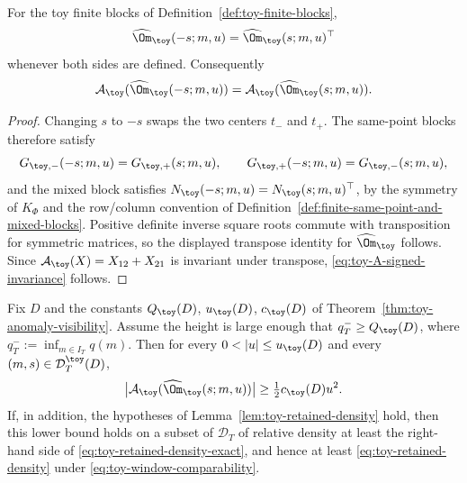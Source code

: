 \begin{lemma}
\label{lem:toy-signed-separation-invariance}
For the toy finite blocks of Definition~\ref{def:toy-finite-blocks},
\[
        \widehat\Om_\toy(-s;m,u)=\widehat\Om_\toy(s;m,u)^\top
\]
whenever both sides are defined.  Consequently
\begin{equation}
\label{eq:toy-A-signed-invariance}
        \mathcal A_\toy(\widehat\Om_\toy(-s;m,u))
        =\mathcal A_\toy(\widehat\Om_\toy(s;m,u)).
\end{equation}
\end{lemma}

\begin{proof}
Changing \(s\) to \(-s\) swaps the two centers \(t_-\) and \(t_+\).
The same-point blocks therefore satisfy
\[
        G_{\toy,-}(-s;m,u)=G_{\toy,+}(s;m,u),\qquad
        G_{\toy,+}(-s;m,u)=G_{\toy,-}(s;m,u),
\]
and the mixed block satisfies
\(N_\toy(-s;m,u)=N_\toy(s;m,u)^\top\), by the symmetry of
\(K_\Phi\) and the row/column convention of
Definition~\ref{def:finite-same-point-and-mixed-blocks}.  Positive
definite inverse square roots commute with transposition for symmetric
matrices, so the displayed transpose identity for \(\widehat\Om_\toy\)
follows.  Since
\(\mathcal A_\toy(X)=X_{12}+X_{21}\) is invariant under transpose,
\eqref{eq:toy-A-signed-invariance} follows.
\end{proof}


\begin{corollary}
\label{cor:toy-visibility-polynomial-weight}
Fix \(D\) and the constants \(Q_\toy(D)\), \(u_\toy(D)\), \(c_\toy(D)\)
of Theorem~\ref{thm:toy-anomaly-visibility}.  Assume the height is large
enough that \(q_T^-\ge Q_\toy(D)\), where
\(q_T^-:=\inf_{m\in I_T}q(m)\).  Then for every \(0<|u|\le
u_\toy(D)\) and every \((m,s)\in\mathcal D_T^\toy(D)\),
\begin{equation}
\label{eq:toy-anomaly-visibility-on-subdomain}
        \bigl|\mathcal A_\toy(\widehat\Om_\toy(s;m,u))\bigr|
        \ge \tfrac12 c_\toy(D)u^2.
\end{equation}
If, in addition, the hypotheses of Lemma~\ref{lem:toy-retained-density}
hold, then this lower bound holds on a subset of \(\mathcal D_T\) of
relative density at least the right-hand side of
\eqref{eq:toy-retained-density-exact}, and hence at least
\eqref{eq:toy-retained-density} under
\eqref{eq:toy-window-comparability}.
\end{corollary}


